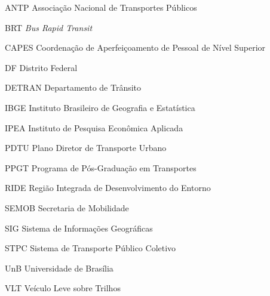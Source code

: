 \documentclass[mestrado,onehalfspacing,12pt,hyperref]{UnB-PPGT}
\begin{document}
\begin{siglas}
\item[ANTP] Associação Nacional de Transportes Públicos
\item[BRT] \textit{Bus Rapid Transit}
\item[CAPES] Coordenação de Aperfeiçoamento de Pessoal de Nível Superior
\item[DF] Distrito Federal
\item[DETRAN] Departamento de Trânsito
\item[IBGE] Instituto Brasileiro de Geografia e Estatística
\item[IPEA] Instituto de Pesquisa Econômica Aplicada
\item[PDTU] Plano Diretor de Transporte Urbano
\item[PPGT] Programa de Pós-Graduação em Transportes
\item[RIDE] Região Integrada de Desenvolvimento do Entorno
\item[SEMOB] Secretaria de Mobilidade
\item[SIG] Sistema de Informações Geográficas
\item[STPC] Sistema de Transporte Público Coletivo
\item[UnB] Universidade de Brasília
\item[VLT] Veículo Leve sobre Trilhos
\end{siglas}


\textual







\postextual



% 

% 
\end{document}
